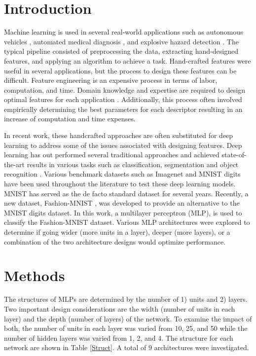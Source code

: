 \documentclass[conference]{IEEEtran}
\begin{document}
\section{Introduction}
	Machine learning is used in several real-world applications such as autonomous vehicles \cite{curio1999walking}, automated medical diagnosis \cite{wang2014mitosis}, and explosive hazard detection \cite{anderson2012combination}. The typical pipeline consisted of preprocessing the data, extracting hand-designed features, and applying an algorithm to achieve a task. Hand-crafted features were useful in several applications, but the process to design these features can be difficult. Feature engineering is an expensive process in terms of labor, computation, and time. Domain knowledge and expertise are required to design optimal features for each application \cite{ng2013machine}. Additionally, this process often involved empirically determining the best parameters for each descriptor resulting in an increase of computation and time expenses. 
	\par In recent work, these handcrafted approaches are often substituted for deep learning to address some of the issues associated with designing features. Deep learning has out performed several traditional approaches and achieved state-of-the-art results in various tasks such as classification, segmentation and object recognition \cite{he2016deep,krizhevsky2012imagenet,liang2015recurrent,long2015fully}. Various benchmark datasets such as Imagenet\cite{deng2009imagenet} and MNIST digits\cite{lecun1998gradient} have been used throughout the literature to test these deep learning models. MNIST has served as the de facto standard dataset for several years. Recently, a new dataset, Fashion-MNIST \cite{xiao2017fashion}, was developed to provide an alternative to the MNIST digits dataset. In this work, a multilayer perceptron (MLP), is used to classify the Fashion-MNIST dataset. Various MLP architectures were explored to determine if going wider (more units in a layer), deeper (more layers), or a combination of the two architecture designs would optimize performance.

\section{Methods}
	The structures of MLPs are determined by the number of 1) units and 2) layers. Two important design considerations are the width (number of units in each layer) and the depth (number of layers) of the network. To examine the impact of both, the number of units in each layer was varied from 10, 25, and 50 while the number of hidden layers was varied from 1, 2, and 4. The structure for each network are shown in Table \ref{Struct}. A total of 9 architectures were investigated.
	
\end{document}
